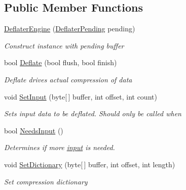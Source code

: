 \subsection*{Public Member Functions}
\begin{DoxyCompactItemize}
\item 
\hyperlink{class_i_c_sharp_code_1_1_sharp_zip_lib_1_1_zip_1_1_compression_1_1_deflater_engine_a022360f0f70743711abb790677efdcc0}{Deflater\+Engine} (\hyperlink{class_i_c_sharp_code_1_1_sharp_zip_lib_1_1_zip_1_1_compression_1_1_deflater_pending}{Deflater\+Pending} pending)
\begin{DoxyCompactList}\small\item\em Construct instance with pending buffer \end{DoxyCompactList}\item 
bool \hyperlink{class_i_c_sharp_code_1_1_sharp_zip_lib_1_1_zip_1_1_compression_1_1_deflater_engine_a7f0e92fbf6e49d5fc251993e13b08d20}{Deflate} (bool flush, bool finish)
\begin{DoxyCompactList}\small\item\em Deflate drives actual compression of data \end{DoxyCompactList}\item 
void \hyperlink{class_i_c_sharp_code_1_1_sharp_zip_lib_1_1_zip_1_1_compression_1_1_deflater_engine_ab1fe3a452efc5e02b8ef7ff799d68fdf}{Set\+Input} (byte\mbox{[}$\,$\mbox{]} buffer, int offset, int count)
\begin{DoxyCompactList}\small\item\em Sets input data to be deflated. Should only be called when \end{DoxyCompactList}\item 
bool \hyperlink{class_i_c_sharp_code_1_1_sharp_zip_lib_1_1_zip_1_1_compression_1_1_deflater_engine_a475e9858378cc276c87dd412ba377e2d}{Needs\+Input} ()
\begin{DoxyCompactList}\small\item\em Determines if more \hyperlink{class_i_c_sharp_code_1_1_sharp_zip_lib_1_1_zip_1_1_compression_1_1_deflater_engine_ab1fe3a452efc5e02b8ef7ff799d68fdf}{input} is needed. \end{DoxyCompactList}\item 
void \hyperlink{class_i_c_sharp_code_1_1_sharp_zip_lib_1_1_zip_1_1_compression_1_1_deflater_engine_aeac659aa6215db8d4d3d862a22ed4450}{Set\+Dictionary} (byte\mbox{[}$\,$\mbox{]} buffer, int offset, int length)
\begin{DoxyCompactList}\small\item\em Set compression dictionary \end{DoxyCompactList}\item 

\end{DoxyCompactItemize}
